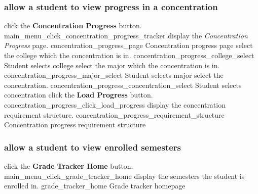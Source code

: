 \documentclass[12pt]{article}
\newenvironment{requirement}[1]
{
    \renewcommand{\thesubsubsection}{R\arabic{subsubsection}.}
    \renewcommand{\labelenumi}{
        \arabic{subsubsection}.\arabic{enumi}
    }
    \renewcommand{\labelenumii}{
        \arabic{subsubsection}.\arabic{enumi}.\arabic{enumii}
    }
    \renewcommand{\labelenumiii}{
        \arabic{subsubsection}.\arabic{enumi}.\arabic{enumii}.\arabic{enumiii}
    }
    \renewcommand{\labelenumiv}{
        \arabic{subsubsection}.\arabic{enumi}.\arabic{enumii}.\arabic{enumiii}.\arabic{enumiv}
    }
    \subsubsection{#1}
    \begin{enumerate}
}
{
    \end{enumerate}
}
\begin{document}
\begin{requirement}{\sysshall allow a student to view progress in a concentration}
    \mainmenu
    \screenshotstep
      {\stushall click the \textbf{Concentration Progress} button.}
      {main_menu_click_concentration_progress_tracker}
      {}
    \screenshotstep
      {\sysshall display the \emph{Concentration Progress} page.}
      {concentration_progress_page}
      {Concentration progress page}
    \screenshotstep
      {\stushall select the college which the concentration is in.}
      {concentration_progress_college_select}
      {Student selects college}
    \screenshotstep
      {\stushall select the major which the concentration is in.}
      {concentration_progress_major_select}
      {Student selects major}
    \screenshotstep
      {\stushall select the concentration.}
      {concentration_progress_concentration_select}
      {Student selects concentration}
    \screenshotstep
      {\stushall click the \textbf{Load Progress} button.}
      {concentration_progress_click_load_progress}
      {}
    \screenshotstep
      {\sysshall display the concentration requirement structure.}
      {concentration_progress_requirement_structure}
      {Concentration progress requirement structure}
\end{requirement}

\newcommand{\navsemesters}{
    \mainmenu
    \screenshotstep
      {\stushall click the \textbf{Grade Tracker Home} button.}
      {main_menu_click_grade_tracker_home}
      {\studentclicks{Grade Tracker Home}}
    \screenshotstep
      {\sysshall display the semesters the student is enrolled in.}
      {grade_tracker_home}
      {Grade tracker homepage}
}

\begin{requirement}{\sysshall allow a student to view enrolled semesters}
    \navsemesters
\end{requirement}
\end{document}
